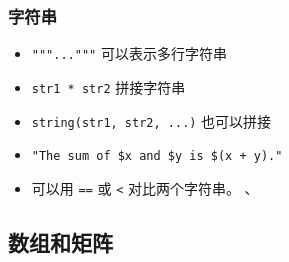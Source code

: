 \subsubsection{字符串}
\begin{itemize}
\item \verb`"""..."""` 可以表示多行字符串
\item \verb`str1 * str2` 拼接字符串
\item \verb`string(str1, str2, ...)` 也可以拼接
\item \verb`"The sum of $x and $y is $(x + y)."`
\item 可以用 \verb`==` 或 \verb`<` 对比两个字符串。
、
\end{itemize}

\subsection{数组和矩阵}
